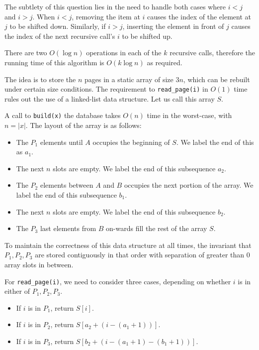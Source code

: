 \documentclass[12pt,twoside]{article}
\begin{document}
\begin{problems}
\begin{problemparts}
The subtlety of this question lies in the need to handle both cases where \(i<j\) and \(i>j\). When \(i<j\), removing the item at \(i\) causes the index of the element at \(j\) to be shifted down. Similarly, if \(i>j\), inserting the element in front of \(j\) causes the index of the next recursive call's \(i\) to be shifted up.

There are two \(O(\log n)\) operations in each of the \(k\) recursive calls, therefore the running time of this algorithm is \(O(k \log n)\) as required.
\end{problemparts}

\newpage
\problem  %
The idea is to store the \(n\) pages in a static array of size \(3n\), which can be rebuilt under certain size conditions. The requirement to \verb|read_page(i)| in \(O(1)\) time rules out the use of a linked-list data structure. Let us call this array \(S\).

A call to \verb|build(x)| the database takes \(O(n)\) time in the worst-case, with \(n=|x|\). The layout of the array is as follows:
\begin{itemize}
    \item The \(P_1\) elements until \(A\) occupies the beginning of \(S\). We label the end of this as \(a_1\).
    \item The next \(n\) slots are empty. We label the end of this subsequence \(a_2\).
    \item The \(P_2\) elements between \(A\) and \(B\) occupies the next portion of the array. We label the end of this subsequence \(b_1\).
    \item The next \(n\) slots are empty. We label the end of this subsequence \(b_2\).
    \item The \(P_3\) last elements from \(B\) on-wards fill the rest of the array \(S\).
\end{itemize}

To maintain the correctness of this data structure at all times, the invariant that \(P_1, P_2, P_3\) are stored contiguously in that order with separation of greater than 0 array slots in between.

For \verb|read_page(i)|, we need to consider three cases, depending on whether \(i\) is in either of \(P_1, P_2,P_3\).
\begin{itemize}
    \item If \(i\) is in \(P_1\), return \(S[i]\).
    \item If \(i\) is in \(P_2\), return \(S[a_2 + (i-(a_1+1))]\).
    \item If \(i\) is in \(P_3\), return \(S[b_2+(i-(a_1+1)-(b_1+1))]\).
\end{itemize}


\end{problems}
\end{document}
